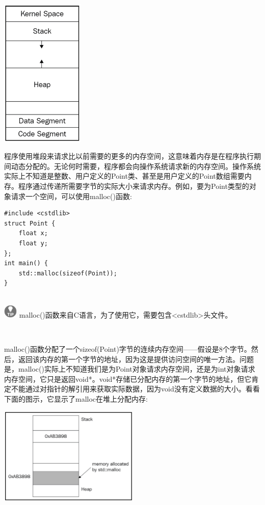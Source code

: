 \begin{center}
	\includegraphics[width=0.3\textwidth]{content/Section-1/Chapter-2/12}
\end{center}

程序使用堆段来请求比以前需要的更多的内存空间，这意味着内存是在程序执行期间动态分配的。无论何时需要，程序都会向操作系统请求新的内存空间。操作系统实际上不知道是整数、用户定义的Point类、甚至是用户定义的Point数组需要内存。程序通过传递所需要字节的实际大小来请求内存。例如，要为Point类型的对象请求一个空间，可以使用malloc()函数: \par

\begin{lstlisting}[caption={}]
#include <cstdlib>
struct Point {
	float x;
	float y;
};
int main() {
	std::malloc(sizeof(Point));
}
\end{lstlisting}

\hspace*{\fill} \\ %
\includegraphics[width=0.05\textwidth]{images/tip}
malloc()函数来自C语言，为了使用它，需要包含<cstdlib>头文件。\par
\noindent\textbf{}\ \par

malloc()函数分配了一个sizeof(Point)字节的连续内存空间——假设是8个字节。然后，返回该内存的第一个字节的地址，因为这是提供访问空间的唯一方法。问题是，malloc()实际上不知道我们是为Point对象请求内存空间，还是为int对象请求内存空间，它只是返回void*。void*存储已分配内存的第一个字节的地址，但它肯定不能通过对指针的解引用来获取实际数据，因为void没有定义数据的大小。看看下面的图示，它显示了malloc在堆上分配内存:\par

\begin{center}
	\includegraphics[width=0.5\textwidth]{content/Section-1/Chapter-2/13}
\end{center}

